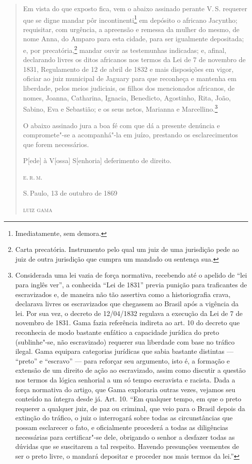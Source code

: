 \begin{quote}
Em vista do que exposto fica, vem o abaixo assinado perante V.\,S.
requerer que se digne mandar pôr incontinenti\footnote{Imediatamente,
  sem demora.} em depósito o africano Jacyntho; requisitar, com
urgência, a apreensão e remessa da mulher do mesmo, de nome Anna, do
Amparo para esta cidade, para ser igualmente depositada; e, por
precatória,\footnote{Carta precatória. Instrumento pelo qual um juiz de
  uma jurisdição pede ao juiz de outra jurisdição que cumpra um mandado
  ou sentença sua.} mandar ouvir as testemunhas indicadas; e, afinal,
declarando livres os ditos africanos nos termos da Lei de 7 de novembro
de 1831, Regulamento de 12 de abril de 1832 e mais disposições em vigor,
oficiar ao juiz municipal de Jaguary para que reconheça e mantenha em
liberdade, pelos meios judiciais, os filhos dos mencionados africanos,
de nomes, Joanna, Catharina, Ignacia, Benedicto, Agostinho, Rita, João,
Sabino, Eva e Sebastião; e os seus netos, Marianna e
Marcellino.\footnote{Considerada uma lei vazia de força normativa,
  recebendo até o apelido de ``lei para inglês ver'', a conhecida ``Lei de
  1831'' previa punição para traficantes de escravizados e, de maneira
  não tão assertiva como a historiografia crava, declarava livres os
  escravizados que chegassem ao Brasil após a vigência da lei. Por sua
  vez, o decreto de 12/04/1832 regulava a execução da Lei de 7 de
  novembro de 1831. Gama fazia referência indireta ao art.
  10 do decreto que reconhecia de modo bastante enfático a capacidade
  jurídica do preto (sublinhe"-se, não escravizado) requerer sua
  liberdade com base no tráfico ilegal. Gama equipara categorias
  jurídicas que sabia bastante distintas --- ``preto'' e ``escravo'' --- para
  reforçar seu argumento, isto é, a formação e extensão de um direito de
  ação ao escravizado, assim como discutir a questão nos termos da
  lógica senhorial a um só tempo escravista e racista. Dada a força
  normativa do artigo, que Gama exploraria outras vezes, vejamos seu conteúdo na
  íntegra desde já. Art. 10. ``Em qualquer tempo, em que o preto requerer
  a qualquer juiz, de paz ou criminal, que veio para o Brasil depois da
  extinção do tráfico, o juiz o interrogará sobre todas as
  circunstâncias que possam esclarecer o fato, e oficialmente procederá
  a todas as diligências necessárias para certificar"-se dele, obrigando
  o senhor a desfazer todas as dúvidas que se suscitarem a tal respeito.
  Havendo presunções veementes de ser o preto livre, o mandará depositar
  e proceder nos mais termos da lei.''}

O abaixo assinado jura a boa fé com que dá a presente denúncia e
compromete"-se a acompanhá"-la em juízo, prestando os esclarecimentos que
forem necessários.

\noindent{}P{[}ede{]} à V{[}ossa{]} S{[}enhoria{]} deferimento de direito.

\noindent\textsc{e.\,r.\,m.}

\medskip

\noindent{}S.\,Paulo, 13 de outubro de 1869\smallskip

\noindent\textsc{luiz gama}
\end{quote}

